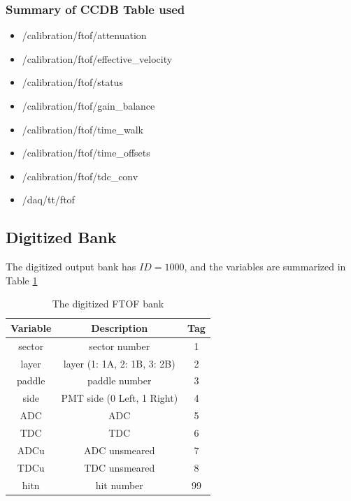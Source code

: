 \subsubsection{Summary of CCDB Table used}
\begin{itemize}
	\item /calibration/ftof/attenuation
	\item /calibration/ftof/effective\_velocity
	\item /calibration/ftof/status
	\item /calibration/ftof/gain\_balance
	\item /calibration/ftof/time\_walk
	\item /calibration/ftof/time\_offsets
	\item /calibration/ftof/tdc\_conv
	\item /daq/tt/ftof
\end{itemize}

\subsection{Digitized Bank}
The digitized output bank has $ID=1000$, and the variables are summarized in Table \ref{tab:ftofBank}

\begin{table}[h]
	\begin{center}
		\begin{tabular}{| c | c | c |}
			\hline \hline
			Variable         & Description  & Tag  \\
			\hline
              sector  &                             sector number  &    1 \\
               layer  &               layer (1: 1A, 2: 1B, 3: 2B)  &    2 \\
              paddle  &                             paddle number  &    3 \\
                side  &                PMT side (0 Left, 1 Right)  &    4 \\
                 ADC  &                                       ADC  &    5 \\
                 TDC  &                                       TDC  &    6 \\
                ADCu  &                             ADC unsmeared  &    7 \\
                TDCu  &                             TDC unsmeared  &    8 \\
                hitn  &                                hit number  &   99 \\
			\hline \hline
		\end{tabular}
	\end{center}
	\caption{The digitized FTOF bank}\label{tab:ftofBank}
\end{table}


